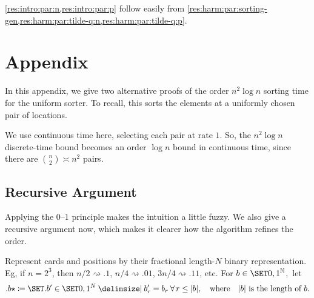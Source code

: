 \documentclass{article}
\begin{document}

\cref{res:intro:par:n,res:intro:par:p} follow easily from \cref{res:harm:par:sorting-gen,res:harm:par:tilde-q:n,res:harm:par:tilde-q:p}.





\renewcommand{\bibfont}{\sffamily\small}
\renewcommand{\bibfont}{\sffamily}
\printbibliography[title = {Bibliography}]


\appendix
\section{Appendix}%

In this appendix, we give two alternative proofs of the order $n^2 \log n$ sorting time for the uniform sorter.
To recall, this sorts the elements at a uniformly chosen pair of locations.

We use continuous time here, selecting each pair at rate $1$. So, the $n^2 \log n$ discrete-time bound becomes an order $\log n$ bound in continuous time, since there are $\binom n2 \asymp n^2$ pairs.

\subsection{Recursive Argument}

Applying the 0--1 principle makes the intuition a little fuzzy.
We also give a recursive argument now, which makes it clearer how the algorithm refines the order.

\begin{nota}
Represent cards and positions by their fractional length-$N$ binary representation.
Eg, if $n = 2^3$, then $n/2 \rightsquigarrow .1$, $n/4 \rightsquigarrow .01$, $3n/4 \rightsquigarrow .11$, etc.
For $b \in \set{0,1}^\mbn$,~let
\[
	.b\star
\cq
	\set{ .b' \in \set{0,1}^N \given b'_r = b_r \: \forall \, r \le \abs b },
\Qwhere
	\text{$\abs b$ is the length of $b$}.
\]
\end{nota}
\end{document}

